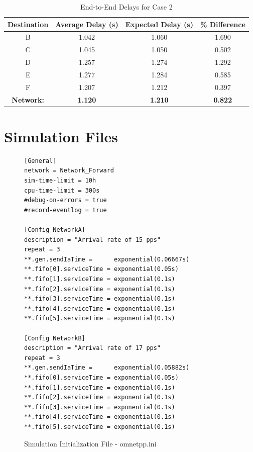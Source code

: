 \documentclass{article}
\begin{document}
\begin{appendices}
\begin{table}[h!]
\centering
\begin{tabular}{|c|c|c|c|} \hline
\textbf{Destination} & \textbf{Average Delay (s)} & \textbf{Expected Delay (s)} & \textbf{\% Difference} \\ \hline
B & 1.042 & 1.060 & 1.690 \\ \hline
C & 1.045 & 1.050 & 0.502 \\ \hline
D & 1.257 & 1.274 & 1.292 \\ \hline
E & 1.277 & 1.284 & 0.585 \\ \hline
F & 1.207 & 1.212 & 0.397 \\ \hline
\textbf{Network:} & \textbf{1.120} & \textbf{1.210} & \textbf{0.822} \\ \hline
\end{tabular}
\caption{End-to-End Delays for Case 2}
\label{tab:nodeDelayB}
\end{table}

\newpage
\section{Simulation Files}
\label{appendix:SimFiles}

\begin{figure}[h!]
\begin{lstlisting}
[General]
network = Network_Forward
sim-time-limit = 10h
cpu-time-limit = 300s
#debug-on-errors = true
#record-eventlog = true

[Config NetworkA]
description = "Arrival rate of 15 pps"
repeat = 3
**.gen.sendIaTime = 	 exponential(0.06667s)
**.fifo[0].serviceTime = exponential(0.05s)
**.fifo[1].serviceTime = exponential(0.1s)
**.fifo[2].serviceTime = exponential(0.1s)
**.fifo[3].serviceTime = exponential(0.1s)
**.fifo[4].serviceTime = exponential(0.1s)
**.fifo[5].serviceTime = exponential(0.1s)

[Config NetworkB]
description = "Arrival rate of 17 pps"
repeat = 3
**.gen.sendIaTime = 	 exponential(0.05882s)
**.fifo[0].serviceTime = exponential(0.05s)
**.fifo[1].serviceTime = exponential(0.1s)
**.fifo[2].serviceTime = exponential(0.1s)
**.fifo[3].serviceTime = exponential(0.1s)
**.fifo[4].serviceTime = exponential(0.1s)
**.fifo[5].serviceTime = exponential(0.1s)
\end{lstlisting}
\vspace{-1cm}
\caption*{Simulation Initialization File - omnetpp.ini}
\end{figure}


\end{appendices}
\end{document}
